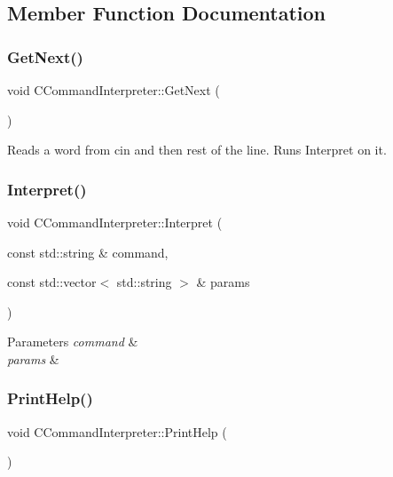 \subsection{Member Function Documentation}
\mbox{\label{class_c_command_interpreter_aaec29447bf0b8574d8324e7c69b59803}} 
\subsubsection{\texorpdfstring{Get\+Next()}{GetNext()}}
{\footnotesize\ttfamily void C\+Command\+Interpreter\+::\+Get\+Next (\begin{DoxyParamCaption}{ }\end{DoxyParamCaption})}

Reads a word from cin and then rest of the line. Runs Interpret on it. \mbox{\label{class_c_command_interpreter_a7efec8fce416d6e12f1ff41b2c0d29ac}} 
\subsubsection{\texorpdfstring{Interpret()}{Interpret()}}
{\footnotesize\ttfamily void C\+Command\+Interpreter\+::\+Interpret (\begin{DoxyParamCaption}\item[{const std\+::string \&}]{command,  }\item[{const std\+::vector$<$ std\+::string $>$ \&}]{params }\end{DoxyParamCaption})}


\begin{DoxyParams}{Parameters}
{\em command} & \\
\hline
{\em params} & \\
\hline
\end{DoxyParams}
\mbox{\label{class_c_command_interpreter_a50802d0147f6bb6301308ddd69e9100d}} 
\subsubsection{\texorpdfstring{Print\+Help()}{PrintHelp()}}
{\footnotesize\ttfamily void C\+Command\+Interpreter\+::\+Print\+Help (\begin{DoxyParamCaption}{ }\end{DoxyParamCaption})}



